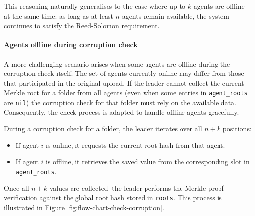 This reasoning naturally generalises to the case where up to $k$ agents are offline at the same time: as long as at least $n$ agents remain available, the system continues to satisfy the Reed-Solomon requirement.

\paragraph{Agents offline during corruption check}

A more challenging scenario arises when some agents are offline during the corruption check itself. The set of agents currently online may differ from those that participated in the original upload. If the leader cannot collect the current Merkle root for a folder from all agents (even when some entries in \texttt{agent\_roots} are \texttt{nil}) the corruption check for that folder must rely on the available data. Consequently, the check process is adapted to handle offline agents gracefully.

During a corruption check for a folder, the leader iterates over all $n+k$ positions:  
\begin{itemize}
    \item If agent $i$ is online, it requests the current root hash from that agent.  
    \item If agent $i$ is offline, it retrieves the saved value from the corresponding slot in \texttt{agent\_roots}.  
\end{itemize}

Once all $n+k$ values are collected, the leader performs the Merkle proof verification against the global root hash stored in \texttt{roots}. This process is illustrated in Figure \ref{fig:flow-chart-check-corruption}.  

